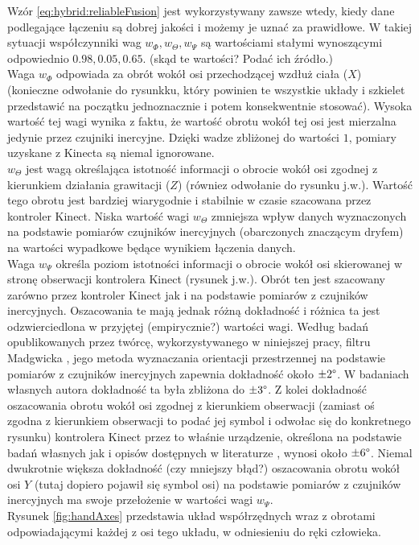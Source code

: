 Wzór \eqref{eq:hybrid:reliableFusion} jest wykorzystywany zawsze wtedy, kiedy dane podlegające łączeniu są dobrej jakości i możemy je uznać za prawidłowe. W takiej sytuacji współczynniki wag $w_\Phi , w_\Theta , w_\Psi$ są wartościami stałymi wynoszącymi odpowiednio $0.98,0.05,0.65$. (skąd te wartości? Podać ich źródło.)\\
Waga $w_\Phi$ odpowiada za obrót wokół osi przechodzącej wzdłuż ciała ($X$) (konieczne odwołanie do rysunkku, który powinien te wszystkie układy i szkielet przedstawić na początku jednoznacznie i potem konsekwentnie stosować). Wysoka wartość tej wagi wynika z faktu, że wartość obrotu wokół tej osi jest mierzalna jedynie przez czujniki inercyjne. Dzięki wadze zbliżonej do wartości $1$, pomiary uzyskane z Kinecta są niemal ignorowane.\\
$w_\Theta$ jest wagą określająca istotność informacji o obrocie wokół osi zgodnej z kierunkiem działania grawitacji ($Z$) (równiez odwołanie do rysunku j.w.). Wartość tego obrotu jest bardziej wiarygodnie i stabilnie w czasie szacowana przez kontroler Kinect. Niska wartość wagi $w_\Theta$ zmniejsza wpływ danych wyznaczonych na podstawie pomiarów czujników inercyjnych (obarczonych znaczącym dryfem) na wartości wypadkowe będące wynikiem łączenia danych.\\ 
Waga $w_\Psi$ określa poziom istotności informacji o obrocie wokół osi skierowanej w stronę obserwacji kontrolera Kinect (rysunek j.w.). Obrót ten jest szacowany zarówno przez kontroler Kinect jak i na podstawie pomiarów z czujników inercyjnych. Oszacowania te mają jednak różną dokładność i różnica ta jest odzwierciedlona w przyjętej (empirycznie?) wartości wagi. Według badań opublikowanych przez twórcę, wykorzystywanego w niniejszej pracy, filtru Madgwicka \cite{Madgwick2010}, jego metoda wyznaczania orientacji przestrzennej na podstawie pomiarów z czujników inercyjnych zapewnia dokładność około $\pm2\degree$. W badaniach własnych autora dokładność ta była zbliżona do $\pm3\degree$. Z kolei dokładność oszacowania obrotu wokół osi zgodnej z kierunkiem obserwacji (zamiast oś zgodna z kierunkiem obserwacji to podać jej symbol i odwołac się do konkretnego rysunku) kontrolera Kinect przez to właśnie urządzenie, określona na podstawie badań własnych jak i opisów dostępnych w literaturze \cite{Huber2015}, wynosi około $\pm6\degree$. Niemal dwukrotnie większa dokładność (czy mniejszy błąd?) oszacowania obrotu wokół osi $Y$ (tutaj dopiero pojawił się symbol osi) na podstawie pomiarów z czujników inercyjnych ma swoje przełożenie w wartości wagi $w_\Psi$.\\
Rysunek \ref{fig:handAxes} przedstawia układ współrzędnych wraz z obrotami odpowiadającymi każdej z osi tego układu, w odniesieniu do ręki człowieka.

